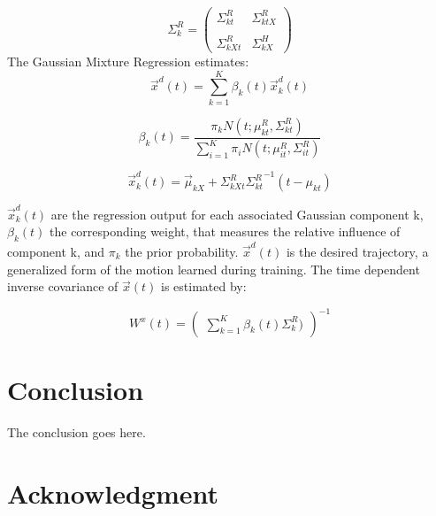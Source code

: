\documentclass[conference]{IEEEtran}
\begin{document}
\begin{itemize}
{    \begin{equation}
        {\Sigma}_{k}^{R} = \begin{pmatrix} {\Sigma}_{kt}^{R}&{\Sigma}_{ktX}^{R}\\ \\ {\Sigma}_{kXt}^{R}&{\Sigma}_{kX}^{H} \end{pmatrix}
    \end{equation}
    The Gaussian Mixture Regression estimates:
    \begin{equation}
        \vec{x}^{d}(t) = \sum_{k=1}^{K} \beta_{k}(t)\vec{x}_{k}^{d}(t)
    \end{equation}

    \begin{equation}
        \beta_{k}(t) = \frac{\pi_{k}N(t;\mu_{kt}^{R},\Sigma_{kt}^{R})}{\sum_{i=1}^{K}\pi_{i}N(t;\mu_{it}^{R},\Sigma_{it}^{R})}
    \end{equation}

    \begin{equation}
        \vec{x}_{k}^{d}(t) = \vec{\mu}_{kX} + {\Sigma}_{kXt}^{R} {{\Sigma}_{kt}^{R}}^{-1} (t - \mu_{kt})
    \end{equation}

    $\vec{x}_{k}^{d}(t)$ are the regression output for each associated Gaussian component k, $\beta_{k}(t)$ the corresponding weight, that measures the relative influence of component k, and $\pi_{k}$ the prior probability. $\vec{x}^{d}(t)$ is the desired trajectory, a generalized form of the motion learned during training. The time dependent inverse covariance of $\vec{x}(t)$ is estimated by:

    \begin{equation}
        W^{x}(t)= \begin{pmatrix}{\sum_{k=1}^{K} \beta_{k}(t) {\Sigma}_{k}^{R})}\end{pmatrix}^{-1}
    \end{equation}


}
\end{itemize}


\section{Conclusion}
The conclusion goes here.

\section*{Acknowledgment}
\end{document}
